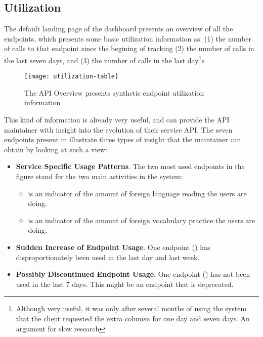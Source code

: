 
\subsection{Utilization}
\label{sec:util}
 
  The default landing page of the dashboard presents an overview of all the endpoints, 
  which presents some basic utilization information as:
  (1) the number of calls to that endpoint since the begining of tracking
  (2) the number of calls in the last seven days, and
  (3) the number of calls in the last day\footnote{Although very useful, it was only after several months of using the system that the client requested the extra columsn for one day and seven days. An argument for slow research}s

    \begin{figure}[h!]
      \centering
      \texttt{[image: utilization-table]}
      \caption{The API Overview presents synthetic endpoint utilization information}
      \label{fig:basicest}
    \end{figure}

  This kind of information is already very useful, and can provide the API maintainer with insight into the evolution of their service API. The seven endpoints present in  illustrate three types of insight that the maintainer can obtain by looking at such a view: 

  \begin{itemize}

    \item {\bf Service Specific Usage Patterns}. The two most used endpoints in the figure stand for the two main activities in the system: 

      \begin{itemize}

        \item \epTranslationsColor is an indicator of the amount of foreign language reading the users are doing. 

        \item \epOutcomeColor is an indicator of the amount of foreign vocabulary practice the users are doing.

      \end{itemize}

    \item {\bf Sudden Increase of Endpoint Usage}. One endpoint (\epUserActivityColor) has disproportionately been used in the last day and last week. 

    \item {\bf Possibly Discontinued Endpoint Usage}. One endpoint (\epFeedItemsColor) has not been used in the last 7 days. This might be an endpoint that is deprecated.

  \end{itemize}


